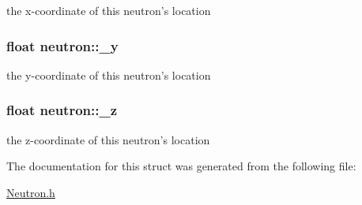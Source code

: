 the x-\/coordinate of this neutron's location \hypertarget{structneutron_a9bc73caa5e8ea77020e7112299deec2e}{
\subsubsection[{\-\_\-y}]{\setlength{\rightskip}{0pt plus 5cm}float neutron\-::\-\_\-y}}\label{structneutron_a9bc73caa5e8ea77020e7112299deec2e}
the y-\/coordinate of this neutron's location \hypertarget{structneutron_a8ee10b15ab1dc8294c84a0d742e15154}{
\subsubsection[{\-\_\-z}]{\setlength{\rightskip}{0pt plus 5cm}float neutron\-::\-\_\-z}}\label{structneutron_a8ee10b15ab1dc8294c84a0d742e15154}
the z-\/coordinate of this neutron's location 

The documentation for this struct was generated from the following file\-:\begin{DoxyCompactItemize}
\item 
\hyperlink{Neutron_8h}{Neutron.\-h}\end{DoxyCompactItemize}
